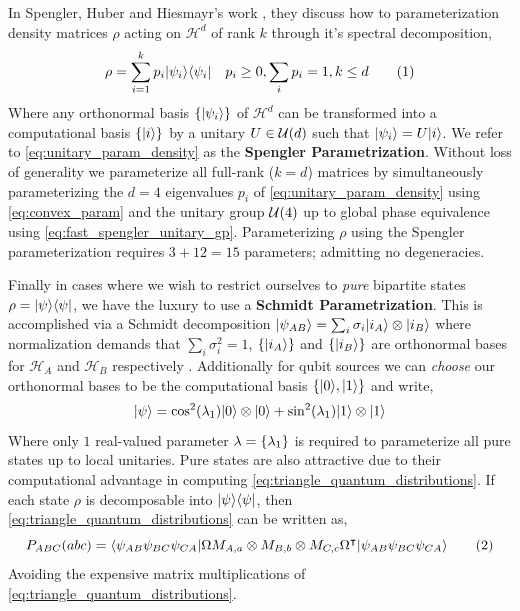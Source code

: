 \documentclass[aps, 10pt, english, twoside, pra, nofootinbib, longbibliography]{revtex4-1}
\theoremstyle{plain}
\theoremstyle{definition}
\theoremstyle{remark}
\newcommand{\Hilb}{\mathcal{H}}
\newcommand{\term}[1]{\textcolor{Mahogany}{\textbf{#1}}}
\begin{document}
    In Spengler, Huber and Hiesmayr's work \cite{Spengler_2010_Unitary}, they discuss how to parameterization density matrices $\rho$ acting on $\Hilb^d$ of rank $k$ through it's spectral decomposition,
    \[ \rho = \sum_{i=1}^{k} p_i \ket{\psi_i}\bra{\psi_i} \quad p_i \geq 0, \sum_{i} p_i = 1, k \leq d \eq \label{eq:unitary_param_density} \]
    Where any orthonormal basis $\bc{\ket{\psi_i}}$ of $\Hilb^d$ can be transformed into a computational basis $\bc{\ket{i}}$ by a unitary $U \in \mathcal{U}\br{d}$ such that $\ket{\psi_i} = U\ket{i}$. We refer to \cref{eq:unitary_param_density} as the \term{Spengler Parametrization}. Without loss of generality we parameterize all full-rank ($k=d$) matrices by simultaneously parameterizing the $d=4$ eigenvalues $p_i$ of \cref{eq:unitary_param_density} using \cref{eq:convex_param} and the unitary group $\mathcal{U}\br{4}$ up to global phase equivalence using \cref{eq:fast_spengler_unitary_gp}. Parameterizing $\rho$ using the Spengler parameterization requires $3 + 12 = 15$ parameters; admitting no degeneracies.

    Finally in cases where we wish to restrict ourselves to \textit{pure} bipartite states $\rho = \ket{\psi}\bra{\psi}$, we have the luxury to use a \term{Schmidt Parametrization}. This is accomplished via a Schmidt decomposition $\ket{\psi_{AB}} = \sum_{i}\sigma_i \ket{i_A}\otimes\ket{i_B}$ where normalization demands that $\sum_{i} \sigma_i^2 = 1$, $\bc{\ket{i_A}}$ and $\bc{\ket{i_B}}$ are orthonormal bases for $\Hilb_A$ and $\Hilb_B$ respectively \cite{Neilsen_Chaung_2011}. Additionally for qubit sources we can \textit{choose} our orthonormal bases to be the computational basis $\bc{\ket{0}, \ket{1}}$ and write,
    \[ \ket{\psi} = \cos^2\br{\lambda_1} \ket{0} \otimes \ket{0} + \sin^2\br{\lambda_1} \ket{1} \otimes \ket{1} \]
    Where only $1$ real-valued parameter $\lambda = \bc{\lambda_1}$ is required to parameterize all pure states up to local unitaries. Pure states are also attractive due to their computational advantage in computing \cref{eq:triangle_quantum_distributions}. If each state $\rho$ is decomposable into $\ket{\psi}\bra{\psi}$, then \cref{eq:triangle_quantum_distributions} can be written as,
    \[ \prob[ABC]\br{abc} = \bramidket{\psi_{AB}\psi_{BC}\psi_{CA}}{\Omega M_{A,a}\otimes M_{B,b} \otimes M_{C,c} \Omega^\intercal}{\psi_{AB}\psi_{BC}\psi_{CA}} \eq \label{eq:pure_state_quantum_triangle} \]
    Avoiding the expensive matrix multiplications of \cref{eq:triangle_quantum_distributions}.
\end{document}
